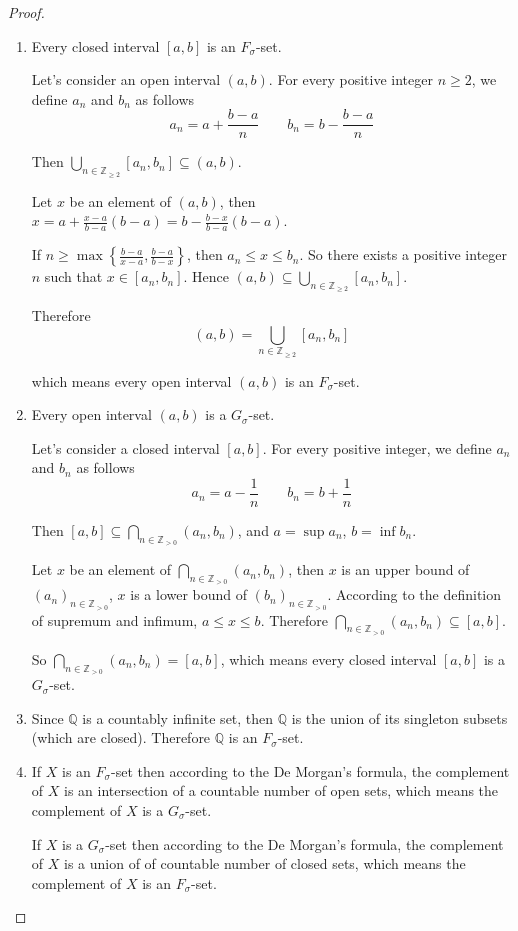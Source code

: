 \begin{proof}
	\begin{enumerate}[label={(\roman*)}]
		\item Every closed interval $[a, b]$ is an $F_{\sigma}$-set.

		      Let's consider an open interval $(a, b)$. For every positive integer $n \geq 2$, we define $a_{n}$ and $b_{n}$ as follows
		      \[
			      a_{n} = a + \frac{b-a}{n}
			      \qquad
			      b_{n} = b - \frac{b-a}{n}
		      \]

		      Then $\bigcup_{n\in\mathbb{Z}_{\geq 2}} [a_{n}, b_{n}] \subseteq (a, b)$.

		      Let $x$ be an element of $(a, b)$, then $x = a + \frac{x - a}{b - a}(b - a) = b - \frac{b - x}{b - a}(b - a)$.

		      If $n\geq \max\left\{ \frac{b-a}{x-a}, \frac{b-a}{b-x} \right\}$, then $a_{n}\leq x\leq b_{n}$. So there exists a positive integer $n$ such that $x\in [a_{n}, b_{n}]$. Hence $(a, b)\subseteq \bigcup_{n\in\mathbb{Z}_{\geq 2}} [a_{n}, b_{n}]$.

		      Therefore
		      \[
			      (a, b) = \bigcup_{n\in\mathbb{Z}_{\geq 2}} [a_{n}, b_{n}]
		      \]

		      which means every open interval $(a, b)$ is an $F_{\sigma}$-set.
		\item Every open interval $(a, b)$ is a $G_{\sigma}$-set.

		      Let's consider a closed interval $[a, b]$. For every positive integer, we define $a_{n}$ and $b_{n}$ as follows
		      \[
			      a_{n} = a - \frac{1}{n}
			      \qquad
			      b_{n} = b + \frac{1}{n}
		      \]

		      Then $[a, b]\subseteq \bigcap_{n\in\mathbb{Z}_{>0}} (a_{n}, b_{n})$, and $a = \sup a_{n}$, $b = \inf b_{n}$.

		      Let $x$ be an element of $\bigcap_{n\in\mathbb{Z}_{> 0}} (a_{n}, b_{n})$, then $x$ is an upper bound of ${(a_{n})}_{n\in\mathbb{Z}_{>0}}$, $x$ is a lower bound of ${(b_{n})}_{n\in\mathbb{Z}_{> 0}}$. According to the definition of supremum and infimum, $a\leq x\leq b$. Therefore $\bigcap_{n\in\mathbb{Z}_{>0}} (a_{n}, b_{n})\subseteq [a, b]$.

		      So $\bigcap_{n\in\mathbb{Z}_{>0}} (a_{n}, b_{n}) = [a, b]$, which means every closed interval $[a, b]$ is a $G_{\sigma}$-set.
		\item Since $\mathbb{Q}$ is a countably infinite set, then $\mathbb{Q}$ is the union of its singleton subsets (which are closed). Therefore $\mathbb{Q}$ is an $F_{\sigma}$-set.
		\item If $X$ is an $F_{\sigma}$-set then according to the De Morgan's formula, the complement of $X$ is an intersection of a countable number of open sets, which means the complement of $X$ is a $G_{\sigma}$-set.

		      If $X$ is a $G_{\sigma}$-set then according to the De Morgan's formula, the complement of $X$ is a union of of countable number of closed sets, which means the complement of $X$ is an $F_{\sigma}$-set.
	\end{enumerate}
\end{proof}
\newpage

